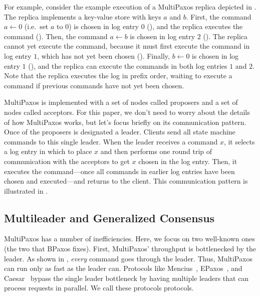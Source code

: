 For example, consider the example execution of a MultiPaxos replica depicted in
. The replica implements a key-value store
with keys $a$ and $b$. First, the command $a \gets 0$ (i.e.\ set $a$ to $0$) is
chosen in log entry $0$ (), and the replica
executes the command (). Then, the command
$a \gets b$ is chosen in log entry $2$ ().
The replica cannot yet execute the command, because it must first execute the
command in log entry $1$, which has not yet been chosen
().  Finally, $b \gets 0$ is chosen in log
entry $1$ (), and the replica can execute
the commands in both log entries $1$ and $2$. Note that the replica executes
the log in prefix order, waiting to execute a command if previous commands have
not yet been chosen.

{}

MultiPaxos is implemented with a set of nodes called proposers and a set of
nodes called acceptors. For this paper, we don't need to worry about the
details of how MultiPaxos works, but let's focus briefly on its communication
pattern. Once of the proposers is designated a leader. Clients send all state
machine commands to this single leader. When the leader receives a command $x$,
it selects a log entry in which to place $x$ and then performs one round trip
of communication with the acceptors to get $x$ chosen in the log entry. Then,
it executes the command---once all commands in earlier log entries have been
chosen and executed---and returns to the client.  This communication pattern is
illustrated in .

{}

\subsection{Multileader and Generalized Consensus}
MultiPaxos has a number of inefficiencies. Here, we focus on two well-known
ones (the two that BPaxos fixes). First, MultiPaxos' throughput is bottlenecked
by the leader. As shown in , \emph{every}
command goes through the leader. Thus, MultiPaxos can run only as fast as the
leader can. Protocols like Mencius~\cite{mao2008mencius},
EPaxos~\cite{moraru2013there}, and Caesar~\cite{arun2017speeding} bypass the
single leader bottleneck by having multiple leaders that can process requests
in parallel. We call these protocols  protocols.

